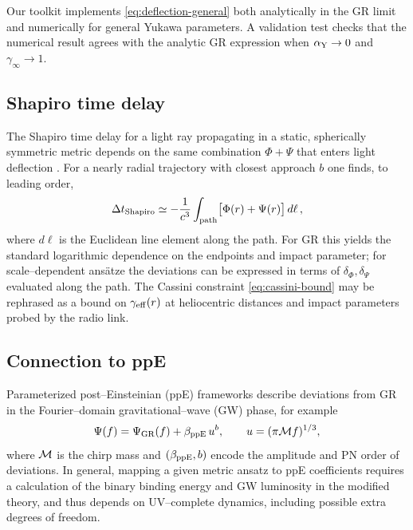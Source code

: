 \documentclass[11pt,a4paper]{article}
\begin{document}
Our toolkit implements \eqref{eq:deflection-general} both analytically in the GR limit and numerically for general Yukawa parameters. A validation test checks that the numerical result agrees with the analytic GR expression when $\alpha_{\rm Y}\to 0$ and $\gamma_\infty\to 1$.

\subsection{Shapiro time delay}

The Shapiro time delay for a light ray propagating in a static, spherically symmetric metric depends on the same combination $\Phi+\Psi$ that enters light deflection \cite{Will2014}. For a nearly radial trajectory with closest approach $b$ one finds, to leading order,
\begin{equation}
\Delta t_{\rm Shapiro} \simeq -\frac{1}{c^3}\int_{\rm path} \bigl[\Phi(r)+\Psi(r)\bigr]\, d\ell\,,
\end{equation}
where $d\ell$ is the Euclidean line element along the path. For GR this yields the standard logarithmic dependence on the endpoints and impact parameter; for scale--dependent ans\"atze the deviations can be expressed in terms of $\delta_\Phi,\delta_\Psi$ evaluated along the path. The Cassini constraint \eqref{eq:cassini-bound} may be rephrased as a bound on $\gamma_{\rm eff}(r)$ at heliocentric distances and impact parameters probed by the radio link.

\subsection{Connection to ppE}
\label{sec:ppe}

Parameterized post--Einsteinian (ppE) frameworks \cite{YunesPretorius2009,YunesSiemens2013} describe deviations from GR in the Fourier--domain gravitational--wave (GW) phase, for example
\begin{equation}
\Psi(f) = \Psi_{\rm GR}(f) + \beta_{\rm ppE}\, u^b, \qquad 
u = (\pi {\cal M} f)^{1/3},
\end{equation}
where ${\cal M}$ is the chirp mass and $(\beta_{\rm ppE},b)$ encode the amplitude and PN order of deviations. In general, mapping a given metric ansatz to ppE coefficients requires a calculation of the binary binding energy and GW luminosity in the modified theory, and thus depends on UV--complete dynamics, including possible extra degrees of freedom.
\end{document}
